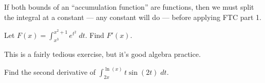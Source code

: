 \documentclass[../main.tex]{subfiles}
\begin{document}
If both bounds of an \enquote{accumulation function} are functions, then we must split the integral at a constant --- any constant will do --- before applying FTC part 1.
\begin{example} \label{ex:ftc-one}
  Let \(F(x) = \int_{x^{3}}^{x^{2} + 1} e^{t^{2}} \;dt\). Find \(F'(x)\).
  \blanks*
\end{example}
\clearpage

This is a fairly tedious exercise, but it's good algebra practice.
\begin{exercise}
  Find the second derivative of \(\int_{2x}^{\ln(x)} t \sin(2t) \;dt\).

  \blanks*
\end{exercise}
\end{document}
